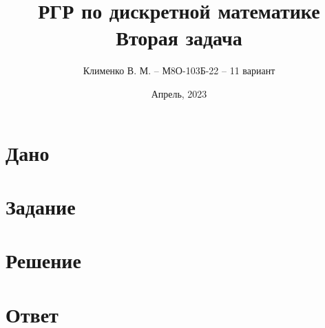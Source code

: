 \documentclass{article}
\title{РГР по дискретной математике\\Вторая задача}
\author{Клименко В. М. -- М8О-103Б-22 -- 11 вариант}
\date{Апрель, 2023}
\begin{document}
\maketitle


\section*{Дано}


\section*{Задание}


\section*{Решение}


\section*{Ответ}
\end{document}
